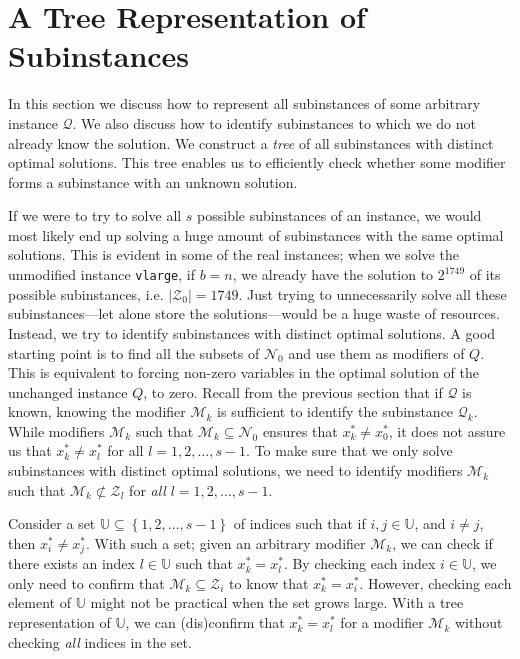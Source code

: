 \section{A Tree Representation of Subinstances}
In this section we discuss how to represent all subinstances of some arbitrary
instance $\mathcal{Q}$. We also discuss how to identify 
subinstances to which we do not already know the solution.
We construct a \emph{tree} of all subinstances with distinct optimal solutions.
This tree enables us to efficiently check whether some modifier forms a
subinstance with an unknown solution.

If we were to try to solve all $s$ possible subinstances of an
instance, we would most likely end up solving a huge amount of subinstances
with the same optimal solutions. This is evident in some of the real
instances; when we solve the unmodified instance \texttt{vlarge}, if $b = n$,
we already have the solution to $2^{1749}$ of its possible subinstances, i.e.
$|\mathcal{Z}_0| = 1749$.
Just trying to unnecessarily solve all these subinstances---let alone store the
solutions---would be a huge waste of resources.
Instead, we try to identify subinstances with distinct optimal solutions.
A good starting point is to find all the subsets of $\mathcal{N}_0$ and
use them as modifiers of $Q$. This is equivalent to forcing non-zero
variables in the optimal solution of the unchanged instance $Q$, to zero.
Recall from the previous section that if $\mathcal{Q}$ is known, knowing the
modifier $\mathcal{M}_k$ is sufficient to identify the subinstance
$\mathcal{Q}_k$.
While modifiers $\mathcal{M}_k$ such that
$\mathcal{M}_k \subseteq \mathcal{N}_0$ ensures that $x_k^*\neq x_0^*$,
it does not assure us that $x_k^* \neq x_l^*$ for all $l=1,2,\ldots,s-1$.
To make sure that we only solve subinstances with distinct optimal solutions,
we need to identify modifiers $\mathcal{M}_k$ such that
$\mathcal{M}_k \not \subset \mathcal{Z}_l$
for \emph{all} $l=1,2,\ldots,s-1$.

Consider a set $\mathbb{U}\subseteq \left\{{1,2,\ldots,s-1}\right\}$ of indices
such that if $i,j \in \mathbb{U}$, and $i \neq j$, then $x_i^* \neq x_j^*$.
With such a set; given an arbitrary modifier $\mathcal{M}_k$, we can check
if there exists an index $l \in \mathbb{U}$ such that $x_k^* = x_l^*$. By
checking each index $i \in \mathbb{U}$, we only need to confirm that
$\mathcal{M}_k \subseteq \mathcal{Z}_i$ to know that $x_k^* = x_i^*$. However,
checking each element of $\mathbb{U}$ might not be practical when the set
grows large. With a tree representation of $\mathbb{U}$, we can (dis)confirm
that $x_k^* = x_l^*$ for a modifier $\mathcal{M}_k$ without checking \emph{all}
indices in the set.

